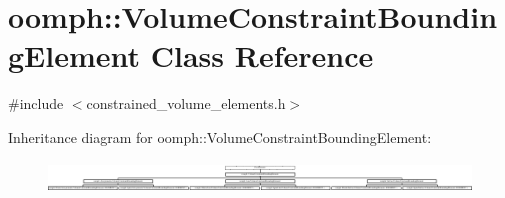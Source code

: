 \hypertarget{classoomph_1_1VolumeConstraintBoundingElement}{}\section{oomph\+:\+:Volume\+Constraint\+Bounding\+Element Class Reference}
\label{classoomph_1_1VolumeConstraintBoundingElement}


{\ttfamily \#include $<$constrained\+\_\+volume\+\_\+elements.\+h$>$}

Inheritance diagram for oomph\+:\+:Volume\+Constraint\+Bounding\+Element\+:\begin{figure}[H]
\begin{center}
\leavevmode
\includegraphics[height=0.825959cm]{classoomph_1_1VolumeConstraintBoundingElement}
\end{center}
\end{figure}
